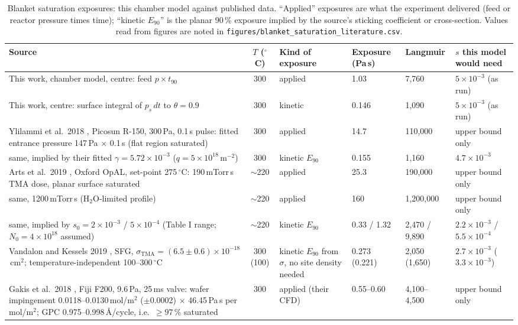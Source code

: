 \documentclass[11pt,letterpaper]{article}
\newcommand{\degC}{$^{\circ}$C}
\begin{document}
\begin{table}[tbp]
\centering
\caption{Blanket saturation exposures: this chamber model against published data. ``Applied'' exposures are what the experiment delivered (feed or reactor pressure times time); ``kinetic $E_{90}$'' is the planar 90\,\% exposure implied by the source's sticking coefficient or cross-section. Values read from figures are noted in \texttt{figures/blanket\_saturation\_literature.csv}.}
\label{tab:litexposure}
\footnotesize
\setlength{\tabcolsep}{4pt}
\begin{tabular}{P{2.15in}cP{0.9in}P{0.65in}P{0.7in}P{0.85in}}
\toprule
Source & $T$ (\degC) & Kind of exposure & Exposure (Pa\,s) & Langmuir & $s$ this model would need \\
\midrule
This work, chamber model, centre: feed $p \times t_{90}$ & 300 & applied & 1.03 & 7,760 & $5\times10^{-3}$ (as run) \\
This work, centre: surface integral of $p_s\,dt$ to $\theta = 0.9$ & 300 & kinetic & 0.146 & 1,090 & $5\times10^{-3}$ (as run) \\
Ylilammi et al.\ 2018 \cite{ylilammi2018}, Picosun R-150, 300\,Pa, 0.1\,s pulse: fitted entrance pressure 147\,Pa $\times$ 0.1\,s (flat region saturated) & 300 & applied & 14.7 & 110,000 & upper bound only \\
same, implied by their fitted $\gamma = 5.72\times10^{-3}$ ($q = 5\times10^{18}$\,m$^{-2}$) & 300 & kinetic $E_{90}$ & 0.155 & 1,160 & $4.7\times10^{-3}$ \\
Arts et al.\ 2019 \cite{arts2019jvsta}, Oxford OpAL, set-point 275\,\degC: 190\,mTorr\,s TMA dose, planar surface saturated & $\sim$220 & applied & 25.3 & 190,000 & upper bound only \\
same, 1200\,mTorr\,s (H$_2$O-limited profile) & $\sim$220 & applied & 160 & 1,200,000 & upper bound only \\
same, implied by $s_0 = 2\times10^{-3}$ / $5\times10^{-4}$ (Table I range; $N_0 = 4\times10^{18}$ assumed) & $\sim$220 & kinetic $E_{90}$ & 0.33 / 1.32 & 2,470 / 9,890 & $2.2\times10^{-3}$ / $5.5\times10^{-4}$ \\
Vandalon and Kessels 2019 \cite{vandalon2019}, SFG, $\sigma_{\mathrm{TMA}} = (6.5 \pm 0.6)\times10^{-18}$\,cm$^2$; temperature-independent 100--300\,\degC\ \cite{vandalon2017} & 300 (100) & kinetic $E_{90}$ from $\sigma$, no site density needed & 0.273 (0.221) & 2,050 (1,650) & $2.7\times10^{-3}$ ($3.3\times10^{-3}$) \\
Gakis et al.\ 2018 \cite{gakis2018}, Fiji F200, 9.6\,Pa, 25\,ms valve: wafer impingement 0.0118--0.0130\,mol/m$^2$ ($\pm$0.0002) $\times$ 46.45\,Pa\,s per mol/m$^2$; GPC 0.975--0.998\,\AA/cycle, i.e.\ $\geq 97$\,\% saturated & 300 & applied (their CFD) & 0.55--0.60 & 4,100--4,500 & upper bound only \\

\end{tabular}
\end{table}
\end{document}
